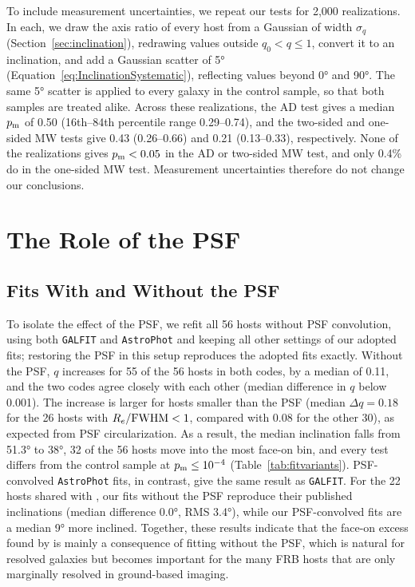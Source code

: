 \documentclass[apjl, linenumbers]{aastex701}
\begin{document}
To include measurement uncertainties, we repeat our tests for 2{,}000
realizations. In each, we draw the axis ratio of every host from a Gaussian
of width $\sigma_q$ (Section~\ref{sec:inclination}), redrawing values outside
$q_0 < q \leq 1$, convert it to an inclination, and add a Gaussian scatter of
\ang{5} (Equation~\ref{eq:InclinationSystematic}), reflecting values beyond
\ang{0} and \ang{90}. The same \ang{5} scatter is applied to every galaxy in
the control sample, so that both samples are treated alike. Across these
realizations, the AD test gives a median $p_{\rm m}$ of 0.50 (16th--84th
percentile range 0.29--0.74), and the two-sided and one-sided MW tests give
0.43 (0.26--0.66) and 0.21 (0.13--0.33), respectively. None of the
realizations gives $p_{\rm m} < 0.05$ in the AD or two-sided MW test, and only
0.4\% do in the one-sided MW test. Measurement uncertainties therefore do not
change our conclusions.

\section{The Role of the PSF} \label{app:psf}

\subsection{Fits With and Without the PSF} \label{app:nopsf}

To isolate the effect of the PSF, we refit all 56 hosts without PSF
convolution, using both \texttt{GALFIT} and \texttt{AstroPhot} and keeping all
other settings of our adopted fits; restoring the PSF in this setup reproduces
the adopted fits exactly. Without the PSF, $q$ increases for 55 of the 56 hosts
in both codes, by a median of 0.11, and the two codes agree closely with each
other (median difference in $q$ below 0.001). The increase is larger for hosts
smaller than the PSF (median $\Delta q = 0.18$ for the 26 hosts with
$R_e/{\rm FWHM} < 1$, compared with 0.08 for the other 30), as expected from
PSF circularization. As a result, the median inclination falls from
\ang{51.3} to \ang{38}, 32 of the 56 hosts move into the most face-on bin, and
every test differs from the control sample at $p_{\rm m} \leq 10^{-4}$
(Table~\ref{tab:fitvariants}). PSF-convolved \texttt{AstroPhot} fits, in
contrast, give the same result as \texttt{GALFIT}. For the 22 hosts shared
with \citet{Bhardwaj2024}, our fits without the PSF reproduce their published
inclinations (median difference \ang{0.0}, RMS \ang{3.4}), while our
PSF-convolved fits are a median \ang{9} more inclined. Together, these results
indicate that the face-on excess found by \citet{Bhardwaj2024} is mainly a
consequence of fitting without the PSF, which is natural for resolved galaxies
but becomes important for the many FRB hosts that are only marginally resolved
in ground-based imaging.
\end{document}
